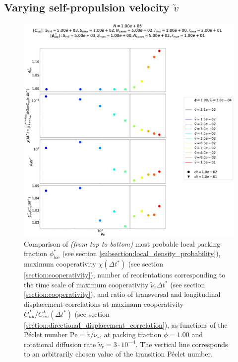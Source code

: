 \documentclass[class=report, float=false, crop=false]{standalone}
\begin{document}
\subsection{Varying self-propulsion velocity $\tilde{v}$}
\vfill
\begin{figure}[h!]
\centering
\includegraphics[width=\textwidth]{figures/figs/comparison_Dl1000_Rh3000_drdt.eps}
\caption{Comparison of \textit{(from top to bottom)} most probable local packing fraction $\phi_{loc}^*$ (see section \ref{subsection:local_density_probability}), maximum cooperativity $\chi(\Delta t^*)$ (see section \ref{section:cooperativity}), number of reorientations corresponding to the time scale of maximum cooperativity $\tilde{\nu}_r\Delta t^*$ (see section \ref{section:cooperativity}), and ratio of transversal and longitudinal displacement correlations at maximum cooperativity $C_{uu}^T/C_{uu}^L(\Delta t^*)$ (see section \ref{section:directional_displacement_correlation}), as functions of the P\'eclet number $\text{Pe} = \tilde{v}/\tilde{\nu}_r$, at packing fraction $\phi = 1.00$ and rotational diffusion rate $\tilde{\nu}_r = 3\cdot10^{—4}$. The vertical line corresponds to an arbitrarily chosen value of the transition P\'eclet number.}
\label{comparison_Dl1000_Rh3000}
\end{figure}
\vfill
\end{document}
